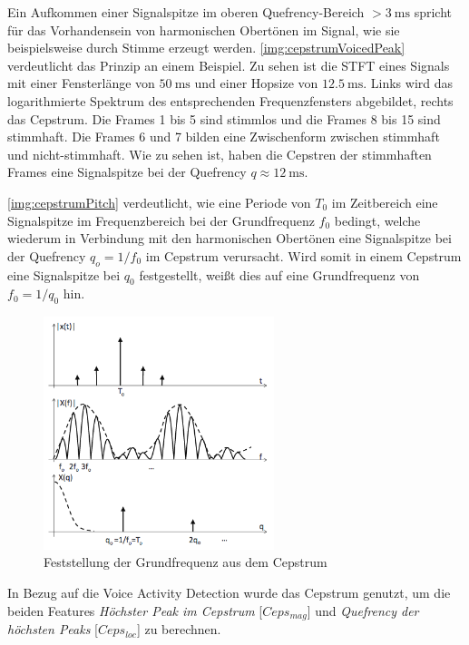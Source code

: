 Ein Aufkommen einer Signalspitze im oberen Quefrency-Bereich $> \SI{3}{\milli\second}$ spricht für das Vorhandensein von harmonischen Obertönen im Signal, wie sie beispielsweise durch Stimme erzeugt werden. \autoref{img:cepstrumVoicedPeak} verdeutlicht das Prinzip an einem Beispiel. Zu sehen ist die STFT eines Signals mit einer Fensterlänge von $\SI{50}{\milli\second}$ und einer Hopsize von $\SI{12.5}{\milli\second}$. Links wird das logarithmierte Spektrum des entsprechenden Frequenzfensters abgebildet, rechts das Cepstrum. Die Frames 1 bis 5 sind stimmlos und die Frames 8 bis 15 sind stimmhaft. Die Frames 6 und 7 bilden eine Zwischenform zwischen stimmhaft und nicht-stimmhaft. Wie zu sehen ist, haben die Cepstren der stimmhaften Frames eine Signalspitze bei der Quefrency $q \approx \SI{12}{\milli\second}$.\cite[S. 16]{ricardo_ceps}

\autoref{img:cepstrumPitch} verdeutlicht, wie eine Periode von $T_0$ im Zeitbereich eine Signalspitze im Frequenzbereich bei der Grundfrequenz $f_0$ bedingt, welche wiederum in Verbindung mit den harmonischen Obertönen eine Signalspitze bei der Quefrency $q_o = 1 / f_0$ im Cepstrum verursacht. Wird somit in einem Cepstrum eine Signalspitze bei $q_0$ festgestellt, weißt dies auf eine Grundfrequenz von $f_0 = 1/q_0$ hin. \cite[S. 5]{cepstrumPitchTranslation}

\begin{figure}[h]
	\centering
	\includegraphics[width=0.6\textwidth]{bilder/cepstrumPitch.png}
	\caption[Feststellung der Grundfrequenz aus dem Cepstrum]{Feststellung der Grundfrequenz aus dem Cepstrum \cite[S. 5]{cepstrumPitchTranslation}}
	\label{img:cepstrumPitch}
\end{figure}

In Bezug auf die Voice Activity Detection wurde das Cepstrum genutzt, um die beiden Features \emph{Höchster Peak im Cepstrum} [$Ceps_{mag}$] und \emph{Quefrency der höchsten Peaks} [$Ceps_{loc}$] zu berechnen.

